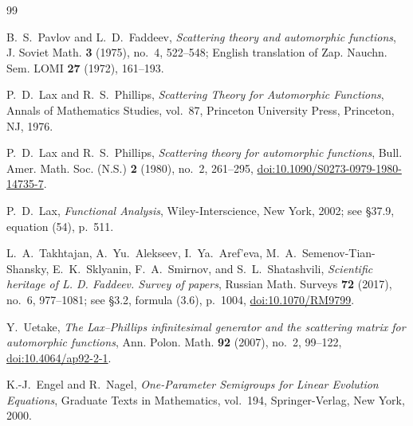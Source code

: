 \documentclass[11pt]{amsart}
\theoremstyle{definition}
\theoremstyle{remark}
\begin{document}
\begin{thebibliography}{99}

B.~S.~Pavlov and L.~D.~Faddeev,
\emph{Scattering theory and automorphic functions},
J. Soviet Math. \textbf{3} (1975), no.~4, 522--548;
English translation of Zap. Nauchn. Sem. LOMI \textbf{27} (1972), 161--193.

P.~D.~Lax and R.~S.~Phillips,
\emph{Scattering Theory for Automorphic Functions},
Annals of Mathematics Studies, vol.~87,
Princeton University Press, Princeton, NJ, 1976.

P.~D.~Lax and R.~S.~Phillips,
\emph{Scattering theory for automorphic functions},
Bull. Amer. Math. Soc. (N.S.) \textbf{2} (1980), no.~2, 261--295,
\href{https://doi.org/10.1090/S0273-0979-1980-14735-7}
{doi:10.1090/S0273-0979-1980-14735-7}.

P.~D.~Lax,
\emph{Functional Analysis},
Wiley-Interscience, New York, 2002; see \S37.9, equation (54), p.~511.

L.~A.~Takhtajan, A.~Yu.~Alekseev, I.~Ya.~Aref'eva,
M.~A.~Semenov-Tian-Shansky, E.~K.~Sklyanin, F.~A.~Smirnov,
and S.~L.~Shatashvili,
\emph{Scientific heritage of L. D. Faddeev. Survey of papers},
Russian Math. Surveys \textbf{72} (2017), no.~6, 977--1081;
see \S3.2, formula (3.6), p.~1004,
\href{https://doi.org/10.1070/RM9799}{doi:10.1070/RM9799}.

Y.~Uetake,
\emph{The Lax--Phillips infinitesimal generator and the scattering matrix for
automorphic functions},
Ann. Polon. Math. \textbf{92} (2007), no.~2, 99--122,
\href{https://doi.org/10.4064/ap92-2-1}{doi:10.4064/ap92-2-1}.

K.-J.~Engel and R.~Nagel,
\emph{One-Parameter Semigroups for Linear Evolution Equations},
Graduate Texts in Mathematics, vol.~194,
Springer-Verlag, New York, 2000.

\end{thebibliography}
\end{document}
